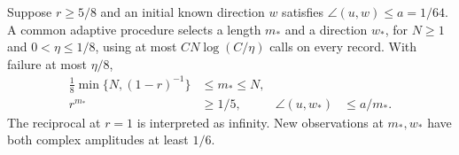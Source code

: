 \begin{lemma}
\label{lem:noiseblock76}
Suppose $r\ge5/8$ and an initial known direction $w$ satisfies
$\angle(u,w)\le a=1/64$.  A common adaptive procedure selects a
length $m_*$ and a direction $w_*$, for $N\ge1$ and
$0<\eta\le1/8$, using at most $CN\log(C/\eta)$ calls on every
record.  With failure at most
$\eta/8$,
\begin{align}
 \tfrac18\min\{N,(1-r)^{-1}\}&\le m_*\le N,
                                      \label{eq:learnblockscale76}\\
 r^{m_*}&\ge1/5,
 &\angle(u,w_*)&\le a/m_*.
                                      \label{eq:learnblockaxis76}
\end{align}
The reciprocal at $r=1$ is interpreted as infinity.  New observations
at $m_*,w_*$ have both complex amplitudes at least $1/6$.
\end{lemma}
